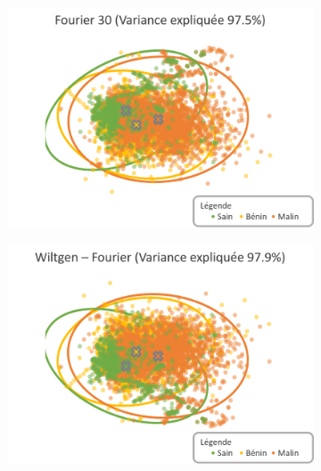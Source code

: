 \begin{figure}[p]
    \begin{subfigure}{.49\textwidth}
      \includegraphics[width=\textwidth]{contents/chapter_4/resources/visualisation_frequency_Fourier30.png}
    \end{subfigure}
    \begin{subfigure}{.49\textwidth}
      \includegraphics[width=\textwidth]{contents/chapter_4/resources/visualisation_frequency_WiltgenFourier.png}
    \end{subfigure}
    

\end{figure}
